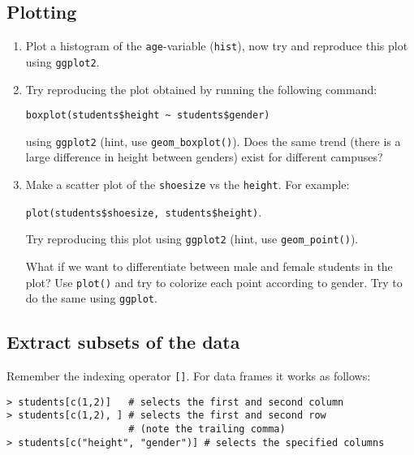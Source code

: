 \documentclass[11pt]{article}
\begin{document}
\subsection*{Plotting}
\begin{enumerate}
\item Plot a histogram of the \texttt{age}-variable (\texttt{hist}),
  now try and reproduce this plot using \texttt{ggplot2}.


 
\item Try reproducing the plot obtained by running the following
  command:

  \noindent\texttt{boxplot(students\$height \textasciitilde
    students\$gender)}
  
  using \texttt{ggplot2} (hint, use \texttt{geom\_boxplot()}). Does
  the same trend (there is a large difference in height between
  genders) exist for different campuses?

\item Make a scatter plot of the \texttt{shoesize} vs the
  \texttt{height}. For example:

  \noindent\texttt{plot(students\$shoesize, students\$height)}. 

  Try reproducing this plot using \texttt{ggplot2} (hint, use
  \texttt{geom\_point()}). 

  What if we want to differentiate between male and female students in
  the plot? Use \texttt{plot()} and try to colorize each point
  according to gender. Try to do the same using \texttt{ggplot}.
\end{enumerate}

\subsection*{Extract subsets of the data}

Remember the indexing operator \texttt{[]}. For data frames it works as follows:

\begin{verbatim}
> students[c(1,2)]   # selects the first and second column
> students[c(1,2), ] # selects the first and second row 
                     # (note the trailing comma)
> students[c("height", "gender")] # selects the specified columns
\end{verbatim}
\end{document}
